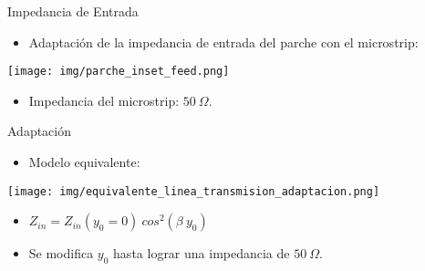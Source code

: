 \begin{frame}{Impedancia de Entrada}
    \begin{itemize}
        \item<1-> Adaptación de la impedancia de entrada del parche con el microstrip:
    \end{itemize}

   \begin{center}
       \texttt{[image: img/parche\_inset\_feed.png]}
   \end{center} 

    \begin{itemize}
        \item<3-> Impedancia del microstrip: $50 \ \Omega$.
    \end{itemize}
    
\end{frame}

\begin{frame}{Adaptación}
    \begin{itemize}
        \item Modelo equivalente:
    \end{itemize}

    \begin{center}
        \texttt{[image: img/equivalente\_linea\_transmision\_adaptacion.png]}
    \end{center}

    \begin{itemize}
        \item $Z_{in} = Z_{in}(y_0 = 0) \ cos^2\left( \beta \ y_0 \right)$
        \item Se modifica $y_0$ hasta lograr una impedancia de $50 \ \Omega$.
    \end{itemize}

\end{frame}